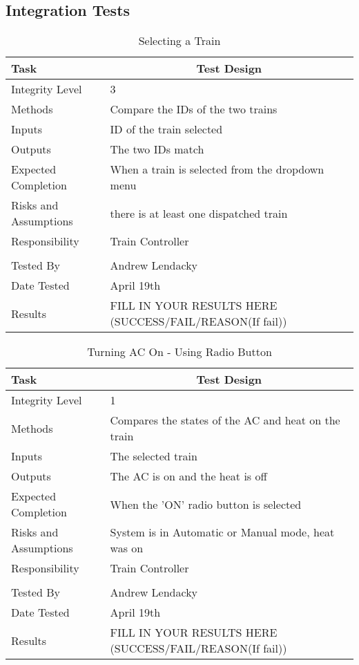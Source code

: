\documentclass[]{article}
\begin{document}
\subsection{Integration Tests}

\begin{table}[H]
	\centering
	\caption{Selecting a Train}
	\begin{tabular}{|l|l|}
		\hline
		Task & \multicolumn{1}{c|}{Test Design} \\ \hline
		Integrity Level & 3 \\ \hline
		Methods & Compare the IDs of the two trains\\ \hline
		Inputs & ID of the train selected \\ \hline
		Outputs &  The two IDs match\\ \hline
		Expected Completion & When a train is selected from the dropdown menu\\ \hline
		Risks and Assumptions & there is at least one dispatched train\\ \hline
		Responsibility & Train Controller\\ \hline
			\\ \hline
		Tested By   &  Andrew Lendacky\\	\hline
		Date Tested & \parbox[t]{10cm}{April 19th}\\ \hline
		Results & FILL IN YOUR RESULTS HERE (SUCCESS/FAIL/REASON(If fail))\\ \hline
	\end{tabular}
\end{table}

\begin{table}[H]
	\centering
	\caption{Turning AC On - Using Radio Button}
	\begin{tabular}{|l|l|}
		\hline
		Task & \multicolumn{1}{c|}{Test Design} \\ \hline
		Integrity Level & 1 \\ \hline
		Methods & Compares the states of the AC and heat on the train\\ \hline
		Inputs & The selected train\\ \hline
		Outputs & The AC is on and the heat is off \\ \hline
		Expected Completion & When the 'ON' radio button is selected\\ \hline
		Risks and Assumptions & System is in Automatic or Manual mode, heat was on \\ \hline
		Responsibility & Train Controller\\ \hline
			\\ \hline
		Tested By   &  Andrew Lendacky\\	\hline
		Date Tested & \parbox[t]{10cm}{April 19th}\\ \hline
		Results & FILL IN YOUR RESULTS HERE (SUCCESS/FAIL/REASON(If fail))\\ \hline
	\end{tabular}
\end{table}
\end{document}
